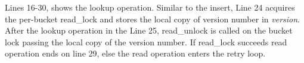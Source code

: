 Lines 16-30, shows the lookup operation. Similar to the insert, Line 24 acquires
the per-bucket read\_lock and stores the local copy of version number in
\emph{version}. After the lookup operation in the Line 25, read\_unlock is
called on the bucket lock passing the local copy of the version number. If
read\_lock succeeds read operation ends on line 29, else the read operation
enters the retry loop. 






















